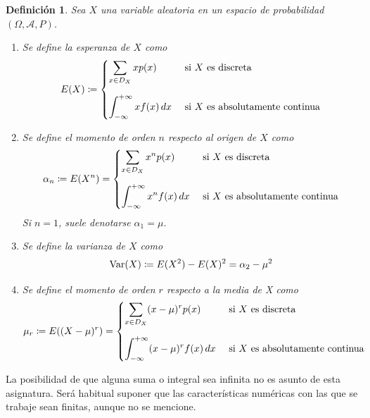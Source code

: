 \documentclass[11pt]{report}
\newtheorem{definition}{Definición}
\theoremstyle{definition}
\begin{document}
\begin{definition}
Sea $X$ una variable aleatoria en un espacio de probabilidad $(\Omega,\mathcal{A},P)$.
\begin{enumerate}
    \item Se define la \emph{esperanza de $X$} como
    \[E(X) \coloneqq \begin{cases}
        \displaystyle \sum_{x \in D_X}xp(x) & $ si $ X $ es discreta$ \\[20pt]
        \displaystyle \int_{-\infty}^{+\infty} xf(x) \, dx & $ si $ X $ es absolutamente continua$ \\
    \end{cases}\]
    \item Se define el \emph{momento de orden $n$ respecto al origen de $X$} como
    \[\alpha_n \coloneqq E(X^n) = \begin{cases}
        \displaystyle \sum_{x \in D_X}x^n p(x) & $ si $ X $ es discreta$ \\[20pt]
        \displaystyle \int_{-\infty}^{+\infty} x^nf(x) \, dx & $ si $ X $ es absolutamente continua$ \\
    \end{cases}
    \]
    Si $n=1$, suele denotarse $\alpha_1=\mu$.
    \item Se define la \emph{varianza de $X$} como
    \[\textup{Var}(X)\coloneqq E(X^2)-E(X)^2=\alpha_2-\mu^2\]
    \item Se define el \emph{momento de orden $r$ respecto a la media de X} como
    \[\mu_r\coloneqq E((X-\mu)^r)=\begin{cases}
        \displaystyle \sum_{x \in D_X}(x-\mu)^r p(x) & $ si $ X $ es discreta$ \\[20pt]
        \displaystyle \int_{-\infty}^{+\infty} (x-\mu)^r f(x) \, dx & $ si $ X $ es absolutamente continua$ \\
    \end{cases}\]
\end{enumerate}
\end{definition}

La posibilidad de que alguna suma o integral sea infinita no es asunto de esta asignatura. Será habitual suponer que las características numéricas con las que se trabaje sean finitas, aunque no se mencione.
\end{document}
